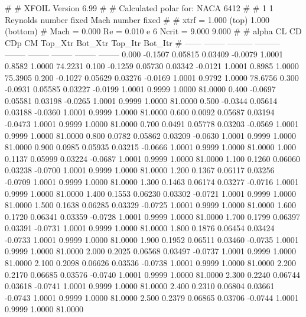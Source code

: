 #  
#       XFOIL         Version 6.99
#  
# Calculated polar for: NACA 6412                                       
#  
# 1 1 Reynolds number fixed          Mach number fixed         
#  
# xtrf =   1.000 (top)        1.000 (bottom)  
# Mach =   0.000     Re =     0.010 e 6     Ncrit =   9.000  9.000
#  
#   alpha    CL        CD       CDp       CM     Top_Xtr  Bot_Xtr  Top_Itr  Bot_Itr
#  ------ -------- --------- --------- -------- -------- -------- -------- --------
   0.000  -0.1507   0.05815   0.03409  -0.0079   1.0001   0.8582   1.0000  74.2231
   0.100  -0.1259   0.05730   0.03342  -0.0121   1.0001   0.8985   1.0000  75.3905
   0.200  -0.1027   0.05629   0.03276  -0.0169   1.0001   0.9792   1.0000  78.6756
   0.300  -0.0931   0.05585   0.03227  -0.0199   1.0001   0.9999   1.0000  81.0000
   0.400  -0.0697   0.05581   0.03198  -0.0265   1.0001   0.9999   1.0000  81.0000
   0.500  -0.0344   0.05614   0.03188  -0.0360   1.0001   0.9999   1.0000  81.0000
   0.600   0.0092   0.05687   0.03194  -0.0473   1.0001   0.9999   1.0000  81.0000
   0.700   0.0491   0.05778   0.03203  -0.0569   1.0001   0.9999   1.0000  81.0000
   0.800   0.0782   0.05862   0.03209  -0.0630   1.0001   0.9999   1.0000  81.0000
   0.900   0.0985   0.05935   0.03215  -0.0666   1.0001   0.9999   1.0000  81.0000
   1.000   0.1137   0.05999   0.03224  -0.0687   1.0001   0.9999   1.0000  81.0000
   1.100   0.1260   0.06060   0.03238  -0.0700   1.0001   0.9999   1.0000  81.0000
   1.200   0.1367   0.06117   0.03256  -0.0709   1.0001   0.9999   1.0000  81.0000
   1.300   0.1463   0.06174   0.03277  -0.0716   1.0001   0.9999   1.0000  81.0000
   1.400   0.1553   0.06230   0.03302  -0.0721   1.0001   0.9999   1.0000  81.0000
   1.500   0.1638   0.06285   0.03329  -0.0725   1.0001   0.9999   1.0000  81.0000
   1.600   0.1720   0.06341   0.03359  -0.0728   1.0001   0.9999   1.0000  81.0000
   1.700   0.1799   0.06397   0.03391  -0.0731   1.0001   0.9999   1.0000  81.0000
   1.800   0.1876   0.06454   0.03424  -0.0733   1.0001   0.9999   1.0000  81.0000
   1.900   0.1952   0.06511   0.03460  -0.0735   1.0001   0.9999   1.0000  81.0000
   2.000   0.2025   0.06568   0.03497  -0.0737   1.0001   0.9999   1.0000  81.0000
   2.100   0.2098   0.06626   0.03536  -0.0738   1.0001   0.9999   1.0000  81.0000
   2.200   0.2170   0.06685   0.03576  -0.0740   1.0001   0.9999   1.0000  81.0000
   2.300   0.2240   0.06744   0.03618  -0.0741   1.0001   0.9999   1.0000  81.0000
   2.400   0.2310   0.06804   0.03661  -0.0743   1.0001   0.9999   1.0000  81.0000
   2.500   0.2379   0.06865   0.03706  -0.0744   1.0001   0.9999   1.0000  81.0000
